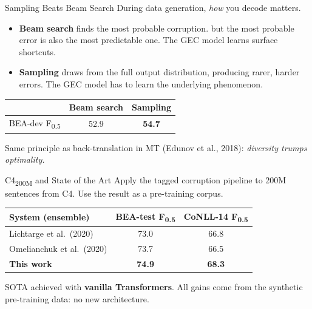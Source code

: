 \documentclass[aspectratio=169]{beamer}
\newcommand{\fhalf}{F\textsubscript{0.5}}
\begin{document}
\begin{frame}{Sampling Beats Beam Search}
  During data generation, \emph{how} you decode matters.\\[1em]

  \begin{itemize}
    \item \textbf{Beam search} finds the most probable corruption.
      but the most probable error is also the most predictable one.
      The GEC model learns surface shortcuts.\\[1em]
    \item \textbf{Sampling} draws from the full output distribution,
      producing rarer, harder errors.
      The GEC model has to learn the underlying phenomenon.
  \end{itemize}

  \vspace{1em}
  \begin{center}
  \begin{tabular}{lcc}
    \toprule
    & \textbf{Beam search} & \textbf{Sampling} \\
    \midrule
    BEA-dev \fhalf & 52.9 & \textbf{54.7} \\
    \bottomrule
  \end{tabular}
  \end{center}

  Same principle as back-translation in MT (Edunov et al., 2018):
  \emph{diversity trumps optimality.}
\end{frame}

\begin{frame}{C4\textsubscript{200M} and State of the Art}
  Apply the tagged corruption pipeline to 200M sentences from C4.
  Use the result as a pre-training corpus.\\[1.5em]

  \begin{center}
  \begin{tabular}{lcc}
    \toprule
    \textbf{System (ensemble)} & \textbf{BEA-test \fhalf} & \textbf{CoNLL-14 \fhalf} \\
    \midrule
    Lichtarge et al.\ (2020) & 73.0 & 66.8 \\
    Omelianchuk et al.\ (2020) & 73.7 & 66.5 \\
    \textbf{This work} & \textbf{74.9} & \textbf{68.3} \\
    \bottomrule
  \end{tabular}
  \end{center}

  \vspace{1em}
  SOTA achieved with \textbf{vanilla Transformers}.
  All gains come from the synthetic pre-training data: no new architecture.
\end{frame}
\end{document}
